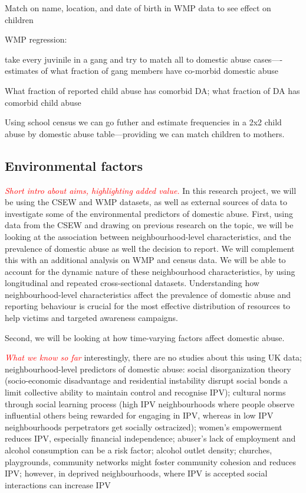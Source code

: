 \documentclass[11pt, a4paper]{article}
\begin{document}
Match on name, location, and date of birth in WMP data to see effect on children

WMP regression:

take every juvinile in a gang and try to match all to domestic abuse cases----estimates of what fraction of gang members have co-morbid domestic abuse

What fraction of reported child abuse has comorbid DA; what fraction of DA has comorbid child abuse

Using school census we can go futher and estimate frequencies in a 2x2 child abuse  by domestic abuse table---providing we can match children to mothers.



\newpage

\subsection*{Environmental factors}

\textcolor{red}{\textit{Short intro about aims, highlighting added value.}}
In this research project, we will be using the CSEW and WMP datasets, as well as external sources of data to investigate some of the environmental predictors of domestic abuse. First, using data from the CSEW and drawing on previous research on the topic, we will be looking at the association between neighbourhood-level characteristics, and the prevalence of domestic abuse as well the decision to report. We will complement this with an additional analysis on WMP and census data. We will be able to account for the dynamic nature of these neighbourhood characteristics, by using longitudinal and repeated cross-sectional datasets. Understanding how neighbourhood-level characteristics affect the prevalence of domestic abuse and reporting behaviour is crucial for the most effective distribution of resources to help victims and targeted awareness campaigns. 

Second, we will be looking at how time-varying factors affect domestic abuse. 



\textcolor{red}{\textit{What we know so far}} interestingly, there are no studies about this using UK data; neighbourhood-level predictors of domestic abuse: social disorganization theory (socio-economic disadvantage and residential instability disrupt social bonds a limit collective ability to maintain control and recognise IPV); cultural norms through social learning process (high IPV neighbourhoods where people observe influential others being rewarded for engaging in IPV, whereas in low IPV neighbourhoods perpetrators get socially ostracized); women's empowerment reduces IPV, especially financial independence;  abuser's lack of employment and alcohol consumption can be a risk factor; alcohol outlet density; churches, playgrounds, community networks might foster community cohesion and reduces IPV;  however, in deprived neighbourhoods, where IPV is accepted social interactions can increase IPV
\end{document}

